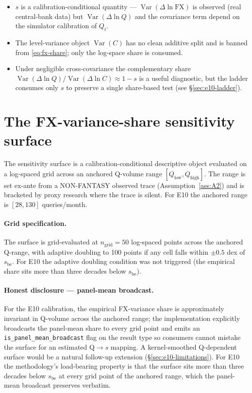 \documentclass[11pt,letterpaper]{article}
\newcommand{\Var}{\operatorname{Var}}
\newcommand{\dln}{\Delta\ln}
\newcommand{\sbe}{s_{\mathrm{be}}}
\newcommand{\Cfx}{\mathrm{FX}}
\theoremstyle{assumption}
\begin{document}
\begin{itemize}
\item $s$ is a calibration-conditional quantity --- $\Var(\dln \Cfx)$ is
  observed (real central-bank data) but $\Var(\dln Q)$ and the covariance
  term depend on the simulator calibration of $Q_t$.
\item The level-variance object $\Var(C)$ has no clean additive split and is
  banned from \eqref{eq:fx-share}; only the log-space share is consumed.
\item Under negligible cross-covariance the complementary share
  $\Var(\dln Q)/\Var(\dln C) \approx 1 - s$ is a useful diagnostic, but the
  ladder consumes only $s$ to preserve a single share-based test (see
  \S\ref{sec:e10-ladder}).
\end{itemize}

\section{The FX-variance-share sensitivity surface}
\label{sec:e10-surface}

The sensitivity surface is a calibration-conditional descriptive object
evaluated on a log-spaced grid across an anchored Q-volume range
$[Q_{\mathrm{low}}, Q_{\mathrm{high}}]$. The range is set ex-ante from a
NON-FANTASY observed trace (Assumption~\ref{ass:A2}) and is bracketed by
proxy research where the trace is silent. For E10 the anchored range is
$[28, 130]$ queries/month.

\paragraph{Grid specification.}
The surface is grid-evaluated at $n_{\mathrm{grid}} = 50$ log-spaced points
across the anchored Q-range, with adaptive doubling to 100 points if any
cell falls within $\pm 0.5$ dex of $\sbe$. For E10 the adaptive doubling
condition was not triggered (the empirical share sits more than three decades
below $\sbe$).

\paragraph{Honest disclosure --- panel-mean broadcast.}
For the E10 calibration, the empirical FX-variance share is approximately
invariant in Q-volume across the anchored range; the implementation
explicitly broadcasts the panel-mean share to every grid point and emits an
\texttt{is\_panel\_mean\_broadcast} flag on the result type so consumers
cannot mistake the surface for an estimated Q$\to s$ mapping. A
kernel-smoothed Q-dependent surface would be a natural follow-up extension
(\S\ref{sec:e10-limitations}). For E10 the methodology's load-bearing
property is that the surface sits more than three decades below $\sbe$ at
every grid point of the anchored range, which the panel-mean broadcast
preserves verbatim.
\end{document}
